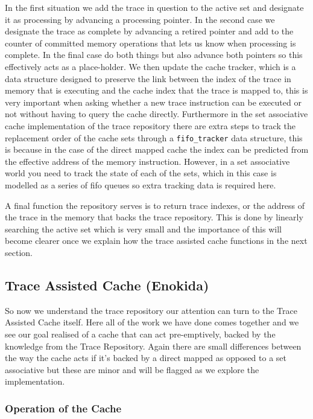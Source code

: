 In the first situation we add the trace in question to the active set and designate it as processing by advancing a processing pointer. In the second case we designate the trace as complete by advancing a retired pointer and add to the counter of committed memory operations that lets us know when processing is complete. In the final case do both things but also advance both pointers so this effectively acts as a place-holder. We then update the cache tracker, which is a data structure designed to preserve the link between the index of the trace in memory that is executing and the cache index that the trace is mapped to, this is very important when asking whether a new trace instruction can be executed or not without having to query the cache directly. Furthermore in the set associative cache implementation of the trace repository there are extra steps to track the replacement order of the cache sets through a \texttt{fifo\_tracker} data structure, this is because in the case of the direct mapped cache the index can be predicted from the effective address of the memory instruction. However, in a set associative world you need to track the state of each of the sets, which in this case is modelled as a series of \gls{fifo} queues so extra tracking data is required here.

A final function the repository serves is to return trace indexes, or the address of the trace in the memory that backs the trace repository. This is done by linearly searching the active set which is very small and the importance of this will become clearer once we explain how the trace assisted cache functions in the next section.

\subsection{Trace Assisted Cache (Enokida)}

So now we understand the trace repository our attention can turn to the Trace Assisted Cache itself. Here all of the work we have done comes together and we see our goal realised of a cache that can act pre-emptively, backed by the knowledge from the Trace Repository. Again there are small differences between the way the cache acts if it's backed by a direct mapped as opposed to a set associative but these are minor and will be flagged as we explore the implementation.

\subsubsection{Operation of the Cache}

